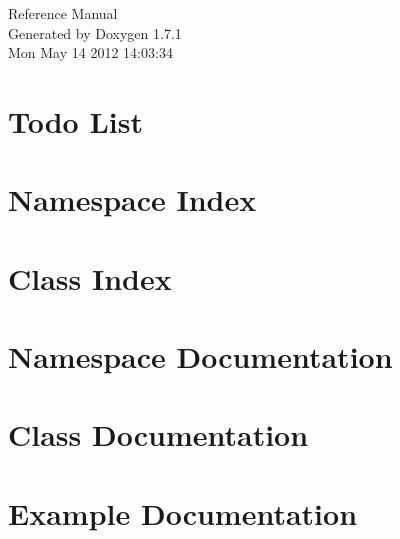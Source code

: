 \documentclass[a4paper]{book}
\begin{document}
\hypersetup{pageanchor=false}
\begin{titlepage}
\vspace*{7cm}
\begin{center}
{\Large Reference Manual}\\
\vspace*{1cm}
{\large Generated by Doxygen 1.7.1}\\
\vspace*{0.5cm}
{\small Mon May 14 2012 14:03:34}\\
\end{center}
\end{titlepage}
\clearemptydoublepage
{}
\tableofcontents
\clearemptydoublepage
{}
\hypersetup{pageanchor=true}
\chapter{Todo List}
\label{todo}
\hypertarget{todo}{}

\chapter{Namespace Index}

\chapter{Class Index}

\chapter{Namespace Documentation}




\chapter{Class Documentation}










\chapter{Example Documentation}

\printindex
\end{document}
